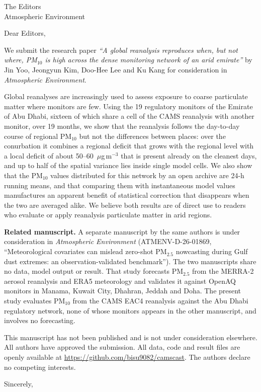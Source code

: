 \documentclass[11pt]{letter}
\begin{document}
\begin{letter}{The Editors\\Atmospheric Environment}
\opening{Dear Editors,}

We submit the research paper \emph{``A global reanalysis reproduces when, but not where,
PM$_{10}$ is high across the dense monitoring network of an arid emirate''} by Jin Yoo, Jeongyun
Kim, Doo-Hee Lee and Ku Kang for consideration in \emph{Atmospheric Environment}.

Global reanalyses are increasingly used to assess exposure to coarse particulate matter where
monitors are few. Using the 19 regulatory monitors of the Emirate of Abu Dhabi, sixteen of which
share a cell of the CAMS reanalysis with another monitor, over 19 months, we show that the
reanalysis follows the day-to-day course of regional PM$_{10}$ but not the differences between
places: over the conurbation it combines a regional deficit that grows with the regional level
with a local deficit of about 50--60~$\mu$g\,m$^{-3}$ that is present already on the cleanest
days, and up to half of the spatial
variance lies inside single model cells. We also show that the PM$_{10}$ values distributed for
this network by an open archive are 24-h running means, and that comparing them with
instantaneous model values manufactures an apparent benefit of statistical correction that
disappears when the two are averaged alike. We believe both results are of direct use to readers
who evaluate or apply reanalysis particulate matter in arid regions.

\textbf{Related manuscript.} A separate manuscript by the same authors is under consideration
in \emph{Atmospheric Environment} (ATMENV-D-26-01869, ``Meteorological covariates can mislead
zero-shot PM$_{2.5}$ nowcasting during Gulf dust extremes: an observation-validated benchmark'').
The two manuscripts share no data, model output or result. That study forecasts PM$_{2.5}$ from
the MERRA-2 aerosol reanalysis and ERA5 meteorology and validates it against OpenAQ monitors in
Manama, Kuwait City, Dhahran, Jeddah and Doha. The present study evaluates PM$_{10}$ from the
CAMS EAC4 reanalysis against the Abu Dhabi regulatory network, none of whose monitors appears in
the other manuscript, and involves no forecasting.

This manuscript has not been published and is not under consideration elsewhere. All authors
have approved the submission. All data, code and result files are openly available at
\url{https://github.com/bisu9082/camscast}. The authors declare no competing interests.

\closing{Sincerely,}
\end{letter}
\end{document}
